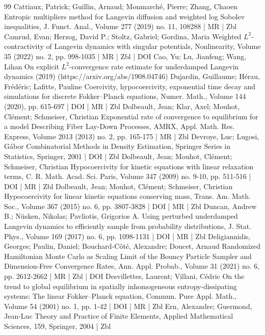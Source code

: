 \begin{thebibliography}{99}
Cattiaux, Patrick; Guillin, Arnaud; Monmarché, Pierre; Zhang, Chaoen Entropic multipliers method for Langevin diffusion and weighted log Sobolev inequalities, J. Funct. Anal., Volume 277 (2019) no. 11, 108288 | MR | Zbl
Camrud, Evan; Herzog, David P.; Stoltz, Gabriel; Gordina, Maria Weighted ${L}^2$-contractivity of Langevin dynamics with singular potentials, Nonlinearity, Volume 35 (2022) no. 2, pp. 998-1035 | MR | Zbl | DOI
Cao, Yu; Lu, Jianfeng; Wang, Lihan On explicit ${L}^2$-convergence rate estimate for underdamped Langevin dynamics (2019) (https://arxiv.org/abs/1908.04746)
Dujardin, Guillaume; Hérau, Frédéric; Lafitte, Pauline Coercivity, hypocoercivity, exponential time decay and simulations for discrete Fokker–Planck equations, Numer. Math., Volume 144 (2020), pp. 615-697 | DOI | MR | Zbl
Dolbeault, Jean; Klar, Axel; Mouhot, Clément; Schmeiser, Christian Exponential rate of convergence to equilibrium for a model Describing Fiber Lay-Down Processes, AMRX, Appl. Math. Res. Express, Volume 2013 (2013) no. 2, pp. 165-175 | MR | Zbl
Devroye, Luc; Lugosi, Gábor Combinatorial Methods in Density Estimation, Springer Series in Statistics, Springer, 2001 | DOI | Zbl
Dolbeault, Jean; Mouhot, Clément; Schmeiser, Christian Hypocoercivity for kinetic equations with linear relaxation terms, C. R. Math. Acad. Sci. Paris, Volume 347 (2009) no. 9-10, pp. 511-516 | DOI | MR | Zbl
Dolbeault, Jean; Mouhot, Clément; Schmeiser, Christian Hypocoercivity for linear kinetic equations conserving mass, Trans. Am. Math. Soc., Volume 367 (2015) no. 6, pp. 3807-3828 | DOI | MR | Zbl
Duncan, Andrew B.; Nüsken, Nikolas; Pavliotis, Grigorios A. Using perturbed underdamped Langevin dynamics to efficiently sample from probability distributions, J. Stat. Phys., Volume 169 (2017) no. 6, pp. 1098-1131 | DOI | MR | Zbl
Deligiannidis, Georges; Paulin, Daniel; Bouchard-Côté, Alexandre; Doucet, Arnaud Randomized Hamiltonian Monte Carlo as Scaling Limit of the Bouncy Particle Sampler and Dimension-Free Convergence Rates, Ann. Appl. Probab., Volume 31 (2021) no. 6, pp. 2612-2662 | MR | Zbl | DOI
Desvillettes, Laurent; Villani, Cédric On the trend to global equilibrium in spatially inhomogeneous entropy-dissipating systems: The linear Fokker–Planck equation, Commun. Pure Appl. Math., Volume 54 (2001) no. 1, pp. 1-42 | DOI | MR | Zbl
Ern, Alexandre; Guermond, Jean-Luc Theory and Practice of Finite Elements, Applied Mathematical Sciences, 159, Springer, 2004 | Zbl

\end{thebibliography}

